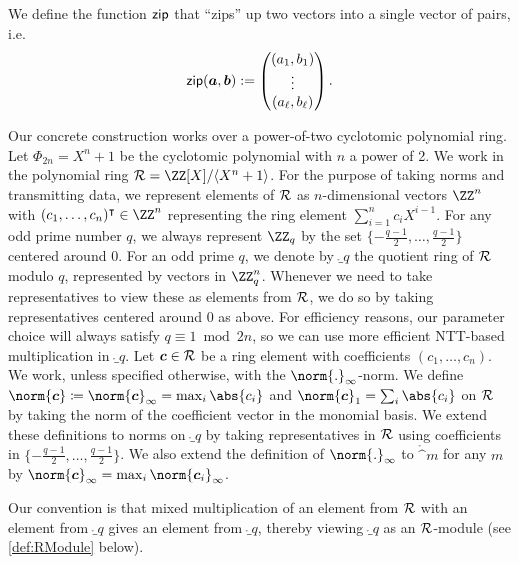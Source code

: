 We define the function $\mathsf{zip}$ that \enquote{zips} up two vectors into a single vector of pairs, i.e.
\[
\mathsf{zip}(\boldsymbol{a},\boldsymbol{b}) := \begin{pmatrix}(a_1,b_1)\\
\vdots\\
(a_\ell,b_\ell) \end{pmatrix}.
\]


Our concrete construction works over a power-of-two cyclotomic polynomial ring.
Let $\Phi_{2n} = X^n+1$ be the cyclotomic polynomial with $n$ a power of 2. 
We work in the polynomial ring $\ring =  \defring$. For the purpose of taking norms and transmitting data, we represent elements of $\mathcal{R}$ as $n$-dimensional vectors $\ZZ^n$ with $(c_1,\dots,c_{n})^\transpose\in \ZZ^n$ representing the ring element $\sum_{i=1}^{n} c_{i} X^{i-1}$.
For any odd prime number $q$, we always represent $\ZZ_q$ by the set $\{-\tfrac{q-1}{2},\ldots,\tfrac{q-1}{2}\}$ centered around 0.
For an odd prime $q$, we denote by $\ring_q$ the quotient ring of $\mathcal{R}$ modulo $q$, represented by vectors in $\ZZ_q^n$. Whenever we need to take representatives to view these as elements from $\mathcal{R}$, we do so by taking representatives centered around 0 as above. For efficiency reasons, our parameter choice will always satisfy $q \equiv 1 \bmod 2n$, so we can use more efficient NTT-based multiplication in $\ring_q$.
Let $\boldsymbol{c} \in \mathcal{R}$ be a ring element with coefficients $(c_1,\ldots, c_{n})$.
We work, unless specified otherwise, with the $\norm{.}_\infty$-norm.
We define $\norm{\vec{c}}\coloneqq\norm{\vec{c}}_\infty = \max_{i}\abs{c_i}$ and $\norm{\vec{c}}_1 = \sum_{i}\abs{c_i}$ on $\mathcal{R}$ by taking the norm of the coefficient vector in the monomial basis.
We extend these definitions to norms on $\ring_q$ by taking representatives in $\mathcal{R}$ using coefficients in $\{-\tfrac{q-1}{2},\ldots,\tfrac{q-1}{2}\}$.
We also extend the definition of $\norm{.}_\infty$ to $\ring^m$ for any $m$ by $\norm{\vec{c}}_{\infty}= \max_i\norm{\vec{c}_i}_\infty$.

Our convention is that mixed multiplication of an element from $\mathcal{R}$ with an element from $\ring_q$ gives an element from $\ring_q$, thereby viewing $\ring_q$ as an $\mathcal{R}$-module (see \autoref{def:RModule} below).

